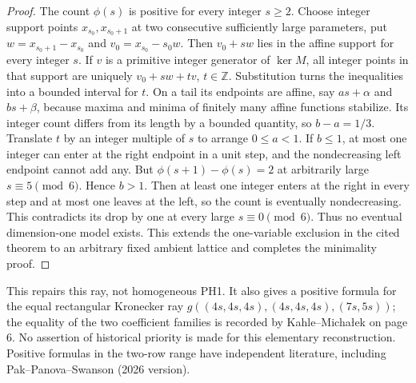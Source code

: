 \documentclass[11pt,a4paper]{article}
\begin{document}
\begin{proof}
The count $\phi(s)$ is positive for every integer $s\ge2$. Choose
integer support points $x_{s_0},x_{s_0+1}$ at two consecutive sufficiently
large parameters, put $w=x_{s_0+1}-x_{s_0}$ and $v_0=x_{s_0}-s_0w$.
Then $v_0+sw$ lies in the affine support for every integer $s$.
If $v$ is a primitive integer generator of $\ker M$, all integer
points in that support are uniquely $v_0+sw+tv$, $t\in\mathbb Z$.
Substitution turns the inequalities into a bounded interval for $t$.
On a tail its endpoints are affine, say $as+\alpha$ and $bs+\beta$,
because maxima and minima of finitely many affine functions stabilize.
Its integer count differs from its length by a bounded quantity,
so $b-a=1/3$. Translate $t$ by an integer multiple of $s$ to arrange
$0\le a<1$.
If $b\le1$, at most one integer can enter at the right endpoint in a
unit step, and the nondecreasing left endpoint cannot add any.
But $\phi(s+1)-\phi(s)=2$ at arbitrarily large $s\equiv5\pmod6$.
Hence $b>1$. Then at least one integer enters at the right in every
step and at most one leaves at the left, so the count is eventually
nondecreasing. This contradicts its drop by one at every large
$s\equiv0\pmod6$. Thus no eventual dimension-one model exists.
This extends the one-variable exclusion in the cited theorem to an
arbitrary fixed ambient lattice and completes the minimality proof.
\end{proof}

This repairs this ray, not homogeneous PH1. It also gives a positive
formula for the equal rectangular Kronecker ray
$g((4s,4s,4s),(4s,4s,4s),(7s,5s))$; the equality of the two coefficient
families is recorded by Kahle--Micha\l ek on page 6.
No assertion of historical priority is made for this elementary
reconstruction. Positive formulas in the two-row range have independent
literature, including Pak--Panova--Swanson (2026 version).
\end{document}
